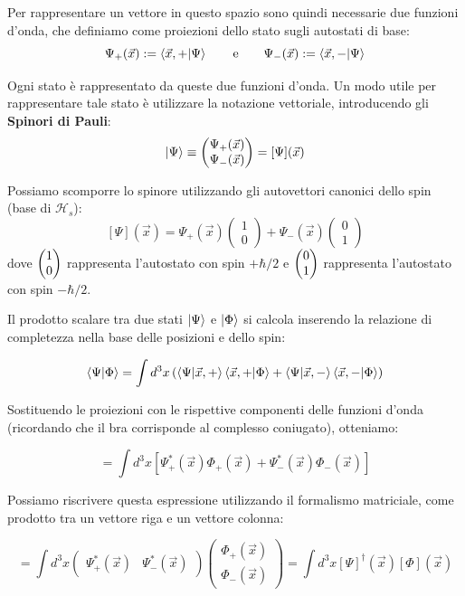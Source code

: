 Per rappresentare un vettore in questo spazio sono quindi necessarie due funzioni d'onda, che definiamo come proiezioni dello stato sugli autostati di base:
\[
    \Psi_+(\vec{x}) := \braket{\vec{x}, +}{\Psi} \qquad \text{e} \qquad \Psi_-(\vec{x}) := \braket{\vec{x}, -}{\Psi}
\]

Ogni stato è rappresentato da queste due funzioni d'onda. Un modo utile per rappresentare tale stato è utilizzare la notazione vettoriale, introducendo gli \textbf{Spinori di Pauli}:
\[
    \ket{\Psi} \equiv \begin{pmatrix} \Psi_+(\vec{x}) \\ \Psi_-(\vec{x}) \end{pmatrix} = [\Psi](\vec{x})
\]

Possiamo scomporre lo spinore utilizzando gli autovettori canonici dello spin (base di \( \mathcal{H}_s \)):
\[
    [\Psi](\vec{x}) = \Psi_+(\vec{x}) \begin{pmatrix} 1 \\ 0 \end{pmatrix} + \Psi_-(\vec{x}) \begin{pmatrix} 0 \\ 1 \end{pmatrix}
\]
dove \( \mqty(1\\0) \) rappresenta l'autostato con spin \( +\hbar/2 \) e \( \mqty(0\\1) \) rappresenta l'autostato con {spin \( -\hbar/2 \).}


Il prodotto scalare tra due stati \( \ket{\Psi} \) e \( \ket{\Phi} \) si calcola inserendo la relazione di completezza nella base delle posizioni e dello spin:

\[
\braket{\Psi}{\Phi} = \int d^3x \left( \braket{\Psi}{\vec{x}, +}\braket{\vec{x}, +}{\Phi} + \braket{\Psi}{\vec{x}, -}\braket{\vec{x}, -}{\Phi} \right)
\]

Sostituendo le proiezioni con le rispettive componenti delle funzioni d'onda (ricordando che il bra corrisponde al complesso coniugato), otteniamo:

\[
= \int d^3x \left[ \Psi_+^*(\vec{x}) \Phi_+(\vec{x}) + \Psi_-^*(\vec{x}) \Phi_-(\vec{x}) \right]
\]

Possiamo riscrivere questa espressione utilizzando il formalismo matriciale, come prodotto tra un vettore riga e un vettore colonna:

\[
= \int d^3x \begin{pmatrix} \Psi_+^*(\vec{x}) & \Psi_-^*(\vec{x}) \end{pmatrix} \begin{pmatrix} \Phi_+(\vec{x}) \\ \Phi_-(\vec{x}) \end{pmatrix} 
= \int d^3x [\Psi]^\dagger(\vec{x}) [\Phi](\vec{x})
\]

